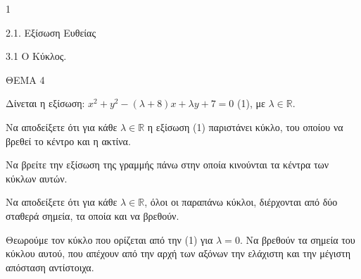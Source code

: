 \begin{ylh}{1}
    \item 2.1. Εξίσωση Ευθείας
    \item 3.1 Ο Κύκλος.
\end{ylh}
ΘΕΜΑ 4

Δίνεται η εξίσωση: $x^2 + y^2 - (\lambda + 8)x + \lambda y + 7 = 0$ (1), με $\lambda \in \mathbb{R}$.

\begin{alist}
\item Να αποδείξετε ότι για κάθε $\lambda \in \mathbb{R}$ η εξίσωση (1) παριστάνει κύκλο, του οποίου να βρεθεί το κέντρο και η ακτίνα. 
\item Να βρείτε την εξίσωση της γραμμής πάνω στην οποία κινούνται τα κέντρα των κύκλων αυτών. 
\item Να αποδείξετε ότι για κάθε $\lambda \in \mathbb{R}$, όλοι οι παραπάνω κύκλοι, διέρχονται από δύο σταθερά σημεία, τα οποία και να βρεθούν. 
\item Θεωρούμε τον κύκλο που ορίζεται από την (1) για $\lambda=0$. Να βρεθούν τα σημεία του κύκλου αυτού, που απέχουν από την αρχή των αξόνων την ελάχιστη και την μέγιστη απόσταση αντίστοιχα. 
\end{alist}